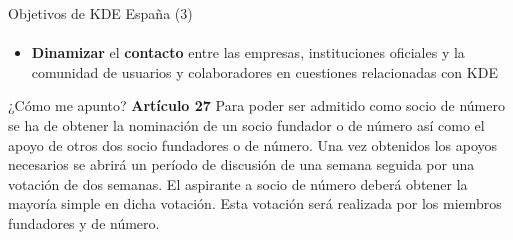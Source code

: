 \documentclass[12pt]{beamer}
\begin{document}
\begin{frame}{Objetivos de KDE España (3)}
  \framesubtitle{}
  \begin{itemize}
    \item \textbf{Dinamizar} el \textbf{contacto} entre las empresas, instituciones oficiales y la comunidad de usuarios y colaboradores en cuestiones relacionadas con KDE
  \end{itemize}
\end{frame}

\begin{frame}{¿Cómo me apunto?}
	 	\textbf{Artículo 27}
 	Para poder ser admitido como socio de número se ha de obtener la nominación de un socio fundador o de número así como el apoyo de otros dos socio fundadores o de número. Una vez obtenidos los apoyos necesarios se abrirá un período de discusión de una semana seguida por una votación de dos semanas. El aspirante a socio de número deberá obtener la mayoría simple en dicha votación. Esta votación será realizada por los miembros fundadores y de número.
\end{frame}

\end{document}
